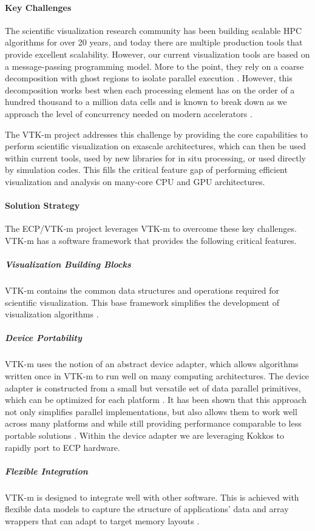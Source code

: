 \paragraph{Key Challenges}
The scientific visualization research community has been building scalable HPC algorithms for over 20 years, and today there are multiple production tools that provide excellent scalability.
However, our current visualization tools are based on a message-passing programming model.
More to the point, they rely on a coarse decomposition with ghost regions to isolate parallel execution \cite{Ahrens2001,Childs2010}.
However, this decomposition works best when each processing element has on the order of a hundred thousand to a million data cells \cite{ParaViewTutorial} and is known to break down as we approach the level of concurrency needed on modern accelerators \cite{Moreland2012:Ultravis,Moreland2013:UltraVis}.

The VTK-m project addresses this challenge by providing the core capabilities to perform scientific visualization on exascale architectures, which can then be used within current tools, used by new libraries for in situ processing, or used directly by simulation codes.
This fills the critical feature gap of performing efficient visualization and analysis on many-core CPU and GPU architectures.


\paragraph{Solution Strategy}
The ECP/VTK-m project leverages VTK-m \cite{Moreland2016:VTKm} to overcome these key challenges.
VTK-m has a software framework that provides the following critical features.


\subparagraph{Visualization Building Blocks}
  VTK-m contains the common data structures and operations required for scientific visualization.
  This base framework simplifies the development of visualization algorithms \cite{VTKmUsersGuide}.
\subparagraph{Device Portability}
  VTK-m uses the notion of an abstract device adapter, which allows algorithms written once in VTK-m to run well on many computing architectures.
  The device adapter is constructed from a small but versatile set of data parallel primitives, which can be optimized for each platform \cite{Blelloch1990}.
  It has been shown that this approach not only simplifies parallel implementations, but also allows them to work well across many platforms \cite{Lo2012,Larsen2015,Moreland2015} and while still providing performance comparable to less portable solutions \cite{Moreland2021}.
  Within the device adapter we are leveraging Kokkos \cite{Edwards2011} to rapidly port to ECP hardware.
\subparagraph{Flexible Integration}
  VTK-m is designed to integrate well with other software.
  This is achieved with flexible data models to capture the structure of applications' data \cite{Meredith2012} and array wrappers that can adapt to target memory layouts \cite{Moreland2012:PDAC}.




